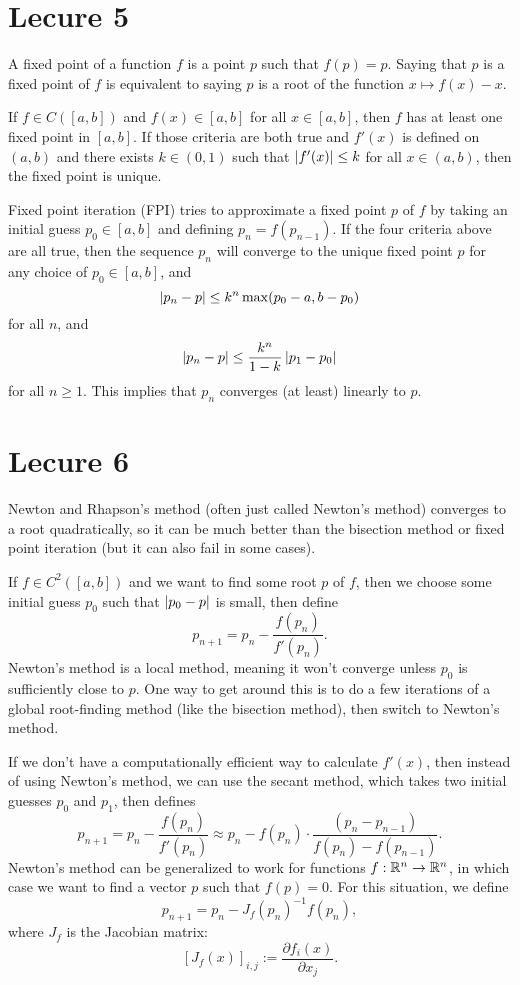 \documentclass{article}
\begin{document}
\section{Lecure 5}
A fixed point of a function $f$ is a point $p$ such that $f(p)=p$. Saying that $p$ is a fixed point of $f$ is equivalent to saying $p$ is a root of the function $x \mapsto f(x)-x$.
\par
If $f \in C([a,b])$ and $f(x) \in [a,b]$ for all $x \in [a,b]$, then $f$ has at least one fixed point in $[a,b]$. If those criteria are both true and $f'(x)$ is defined on $(a,b)$ and there exists $k \in (0,1)$ such that $\left\lvert f'(x) \right\rvert \leq k$ for all $x \in (a,b)$, then the fixed point is unique.
\par
Fixed point iteration (FPI) tries to approximate a fixed point $p$ of $f$ by taking an initial guess $p_0 \in [a,b]$ and defining $p_n=f(p_{n-1})$. If the four criteria above are all true, then the sequence $p_n$ will converge to the unique fixed point $p$ for any choice of $p_0 \in [a,b]$, and
\[ \left\lvert p_n-p \right\rvert \leq k^n \max(p_0-a, b-p_0) \]
for all $n$, and
\[ \left\lvert p_n-p \right\rvert \leq \frac{k^n}{1-k} \left\lvert p_1-p_0 \right\rvert \]
for all $n \geq 1$. This implies that $p_n$ converges (at least) linearly to $p$.

\section{Lecure 6}
Newton and Rhapson's method (often just called Newton's method) converges to a root quadratically, so it can be much better than the bisection method or fixed point iteration (but it can also fail in some cases).
\par
If $f \in C^2([a,b])$ and we want to find some root $p$ of $f$, then we choose some initial guess $p_0$ such that $\left\lvert p_0 - p \right\rvert$ is small, then define
\[ p_{n+1} = p_n - \frac{f(p_n)}{f'(p_n)}. \]
Newton's method is a local method, meaning it won't converge unless $p_0$ is sufficiently close to $p$. One way to get around this is to do a few iterations of a global root-finding method (like the bisection method), then switch to Newton's method.
\par
If we don't have a computationally efficient way to calculate $f'(x)$, then instead of using Newton's method, we can use the secant method, which takes two initial guesses $p_0$ and $p_1$, then defines
\[ p_{n+1} = p_n - \frac{f(p_n)}{f'(p_n)} \approx p_n - f(p_n) \cdot \frac{(p_n-p_{n-1})}{f(p_n)-f(p_{n-1})}. \]
Newton's method can be generalized to work for functions $f: \mathbb{R}^n \rightarrow \mathbb{R}^n$, in which case we want to find a vector $p$ such that $f(p)=0$. For this situation, we define
\[ p_{n+1}=p_n - J_f(p_n)^{-1}f(p_n), \]
where $J_f$ is the Jacobian matrix:
\[ \left[ J_f(x) \right]_{i,j} := \frac{\partial f_i(x)}{\partial x_j}. \]
\end{document}
